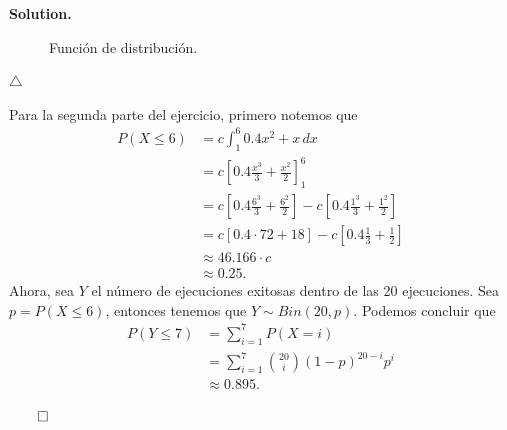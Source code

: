 \documentclass{article}
\theoremstyle{problemstyle}
\newenvironment{solution}{%
  \begin{mdframed}[linewidth=0.8pt,linecolor=Gray,backgroundcolor=Gray!5,roundcorner=5pt]%
  \noindent\textbf{Solution.}%
}{%
\hfill $ \qed $ 
  \end{mdframed}%
}
\begin{document}
\begin{solution}
\begin{figure}[H]
\begin{minipage}{0.4\textwidth}
		\end{minipage}
		\caption{Funci\'on de distribuci\'on.}\label{fig:dist_f_p2}
	\end{figure}
	\hfill $\triangle$


	Para la segunda parte del ejercicio, primero notemos que
	\begin{align*}
		P(X\leq 6) & = c\int_{1}^{6}0.4x^2+x\,dx                                                                          \\
		           & = c\left[0.4 \frac{x^3}{3} + \frac{x^2}{2}\right]_{1}^{6}                                            \\
		           & = c\left[0.4 \frac{6^3}{3} + \frac{6^2}{2}\right] -  c\left[0.4 \frac{1^3}{3} + \frac{1^2}{2}\right] \\
		           & = c\left[0.4\cdot 72 + 18\right] -  c\left[0.4 \frac{1}{3} + \frac{1}{2}\right]                      \\
		           & \approx 46.166\cdot c                                                                                \\
		           & \approx 0.25.
	\end{align*}
  Ahora, sea $ Y $ el n\'umero de ejecuciones exitosas dentro de las 20 ejecuciones. Sea $ p = P(X\leq 6) $, entonces tenemos que $ Y\sim Bin(20, p) $. Podemos concluir que
  \begin{align*}
    P(Y\leq 7) &= \sum_{i=1}^{7} P(X=i)\\
               &= \sum_{i=1}^{7}\binom{20}{i}(1-p)^{20-i}p^{i}\\
               &\approx 0.895.
  \end{align*}

\end{solution}
\end{document}
